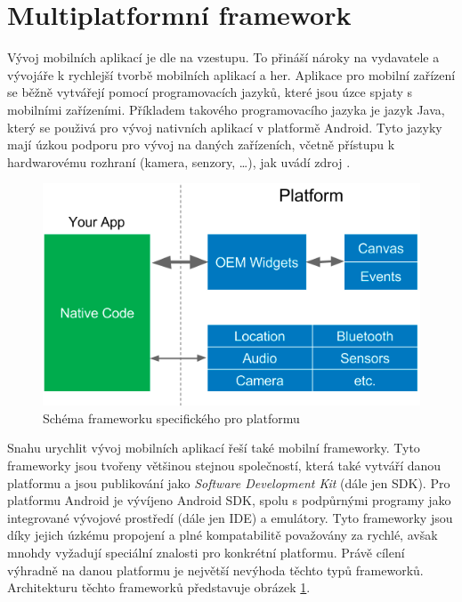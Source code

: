 \section{Multiplatformní framework}

Vývoj mobilních aplikací je dle \cite{wepc_video_game_statistics} na vzestupu.
To přináší nároky na vydavatele a vývojáře k rychlejší tvorbě mobilních
aplikací a her. 
Aplikace pro mobilní zařízení se běžně vytvářejí pomocí programovacích jazyků,
které jsou úzce spjaty s mobilními zařízeními.
Příkladem takového programovacího jazyka je jazyk Java,
který se použivá pro vývoj nativních aplikací v platformě Android.
Tyto jazyky mají úzkou podporu pro vývoj na daných zařízeních,
včetně přístupu k hardwarovému rozhraní (kamera, senzory, \dots{}),
jak uvádí zdroj \cite{dashmagazine_mobile_frameworks}. 

\begin{figure}[ht!]
    \centering
    \includegraphics[width=\linewidth]{assets/technology-research/framework/platform_sdk.png}
    \caption{Schéma frameworku specifického pro platformu  \cite{hackernoon_flutter}}
    \label{fig:framework_platform}
\end{figure}

Snahu urychlit vývoj mobilních aplikací řeší také mobilní frameworky.
Tyto frameworky jsou tvořeny většinou stejnou společností,
která také vytváří danou platformu
a jsou publikování jako \emph{Software Development Kit} (dále jen SDK).
\cite{dashmagazine_mobile_frameworks}
Pro platformu Android je vývíjeno Android SDK,
spolu s podpůrnými programy jako integrované vývojové prostředí
(dále jen IDE) a emulátory.
Tyto frameworky jsou díky jejich úzkému propojení a plné kompatabilitě
považovány za rychlé,
avšak mnohdy vyžadují speciální znalosti pro konkrétní platformu.
Právě cílení výhradně na danou platformu je největší nevýhoda těchto typů
frameworků.
Architekturu těchto frameworků představuje obrázek \ref{fig:framework_platform}.

